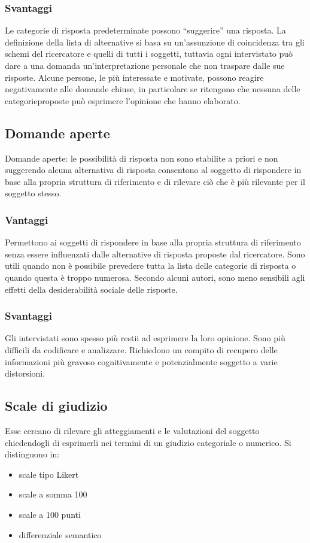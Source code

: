 \subsubsection{Svantaggi}
Le categorie di risposta predeterminate possono “suggerire” una risposta. \newline
La definizione della lista di alternative si basa su un’assunzione di coincidenza tra gli schemi del ricercatore e quelli di tutti i soggetti, tuttavia ogni intervistato può dare a una domanda un’interpretazione personale che non traspare dalle sue risposte. Alcune persone, le più interessate e motivate, possono reagire negativamente alle domande chiuse, in particolare se ritengono che nessuna delle categorieproposte può esprimere l’opinione che hanno elaborato.

\subsection{Domande aperte}
Domande aperte: le possibilità di risposta non sono stabilite a priori e non suggerendo alcuna alternativa di risposta consentono al soggetto di rispondere in base alla propria struttura di riferimento e di rilevare ciò che è più rilevante per il soggetto stesso.
\subsubsection{Vantaggi}
Permettono ai soggetti di rispondere in base alla propria struttura di riferimento senza essere influenzati dalle alternative di risposta proposte dal ricercatore. \newline
Sono utili quando non è possibile prevedere tutta la lista delle categorie di risposta o quando questa è troppo numerosa. \newline
Secondo alcuni autori, sono meno sensibili agli effetti della desiderabilità sociale delle risposte.
\subsubsection{Svantaggi}
Gli intervistati sono spesso più restii ad esprimere la loro opinione. Sono più difficili da codificare e analizzare. Richiedono un compito di recupero delle informazioni più gravoso cognitivamente e potenzialmente soggetto a varie distorsioni.

\subsection{Scale di giudizio}
Esse cercano di rilevare gli atteggiamenti e le valutazioni del soggetto chiedendogli di esprimerli nei termini di un giudizio categoriale o numerico. \newline
Si distinguono in:
\begin{itemize}
	\item scale tipo Likert
	\item scale a somma 100
	\item scale a 100 punti
	\item differenziale semantico
\end{itemize}

